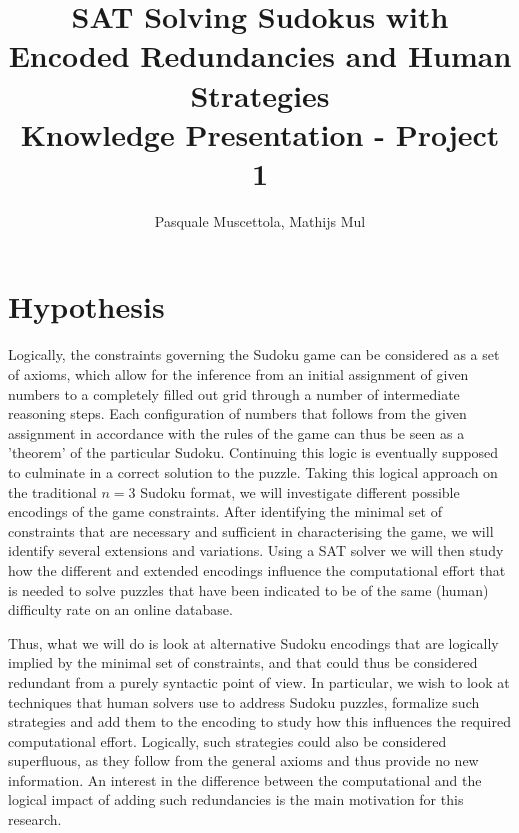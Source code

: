 \documentclass[10pt,a4paper,leqno]{article}
\begin{document}
\title{SAT Solving Sudokus with Encoded Redundancies and Human Strategies \\
Knowledge Presentation - Project 1}
\author{Pasquale Muscettola, Mathijs Mul}
\maketitle

\section*{Hypothesis}


Logically, the constraints governing the Sudoku game can be considered as a set of axioms, which allow for the inference from an initial assignment of given numbers to a completely filled out grid through a number of intermediate reasoning steps. Each configuration of numbers that follows from the given assignment in accordance with the rules of the game can thus be seen as a 'theorem' of the particular Sudoku. Continuing this logic is eventually supposed to culminate in a correct solution to the puzzle. Taking this logical approach on the traditional $n = 3$ Sudoku format, we will investigate different possible encodings of the game constraints. After identifying the minimal set of constraints that are necessary and sufficient in characterising the game, we will identify several extensions and variations. Using a SAT solver we will then study how the different and extended encodings influence the computational effort that is needed to solve puzzles that have been indicated to be of the same (human) difficulty rate on an online database. 

Thus, what we will do is look at alternative Sudoku encodings that are logically implied by the minimal set of constraints, and that could thus be considered redundant from a purely syntactic point of view. In particular, we wish to look at techniques that human solvers use to address Sudoku puzzles, formalize such strategies and add them to the encoding to study how this influences the required computational effort. Logically, such strategies could also be considered superfluous, as they follow from the general axioms and thus provide no new information. An interest in the difference between the computational and the logical impact of adding such redundancies is the main motivation for this research. 
\end{document}
